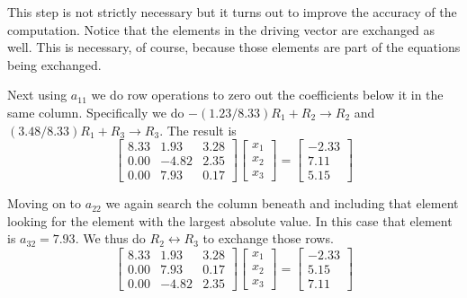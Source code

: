 
This step is not strictly necessary but it turns out to improve the accuracy of the computation.
Notice that the elements in the driving vector are exchanged as well. This is necessary, of
course, because those elements are part of the equations being exchanged.

Next using $a_{11}$ we do row operations to zero out the coefficients below it in the same
column. Specifically we do $-(1.23/8.33)R_1 + R_2 \rightarrow R_2$ and $(3.48/8.33)R_1 + R_3
\rightarrow R_3$. The result is
\begin{displaymath}
\left[
\begin{array}{rrr}
 8.33 &  1.93 & 3.28 \\
 0.00 & -4.82 & 2.35 \\
 0.00 &  7.93 & 0.17 
\end{array}
\right]
\left[
\begin{array}{ccc}
x_1 \\
x_2 \\
x_3
\end{array}
\right] =
\left[
\begin{array}{rrr}
 -2.33 \\
  7.11 \\
  5.15
\end{array}
\right]
\end{displaymath}

Moving on to $a_{22}$ we again search the column beneath and including that element looking for
the element with the largest absolute value. In this case that element is $a_{32} = 7.93$. We
thus do $R_2 \leftrightarrow R_3$ to exchange those rows.
\begin{displaymath}
\left[
\begin{array}{rrr}
 8.33 &  1.93 & 3.28 \\
 0.00 &  7.93 & 0.17 \\
 0.00 & -4.82 & 2.35
\end{array}
\right]
\left[
\begin{array}{ccc}
x_1 \\
x_2 \\
x_3
\end{array}
\right] =
\left[
\begin{array}{rrr}
 -2.33 \\
  5.15 \\
  7.11
\end{array}
\right]
\end{displaymath}

